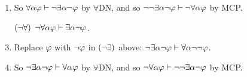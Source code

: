 \documentclass[a4paper, 11pt]{article} %
\begin{document}
\begin{enumerate}
    \item So $\forall \alpha\varphi \vdash \neg \exists \alpha \neg \varphi$ by $\forall$DN, and so $\neg \neg \exists \alpha \neg \varphi \vdash \neg \forall \alpha\varphi$ by MCP. 
  \item[$(\neg\forall)$] $\neg\forall \alpha\varphi \vdash \exists \alpha\neg\varphi$.
    \setcounter{enumi}{0}
    \item Replace $\varphi$ with $\neg \varphi$ in $(\neg\exists)$ above: $\neg \exists \alpha \neg \varphi \vdash \forall \alpha\neg \neg \varphi$. 
    \item So $\neg \exists \alpha \neg \varphi \vdash \forall \alpha\varphi$ by $\forall$DN, and so $\neg \forall \alpha\varphi \vdash \neg \neg \exists \alpha \neg \varphi$ by MCP. 
\end{enumerate}



%
\end{document}
